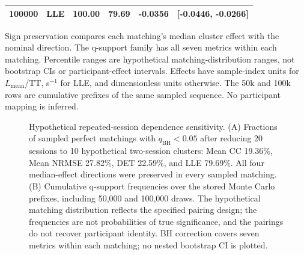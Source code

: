 \begin{table}[p]
{\begin{tabular}{lccccc}
100000 & LLE & 100.00 & 79.69 & -0.0356 & [-0.0446, -0.0266] \\
\bottomrule
\end{tabular}
}
\par\medskip
\begin{minipage}{\textwidth}\footnotesize
Sign preservation compares each matching's median cluster effect with the nominal direction. The q-support family has all seven metrics within each matching. Percentile ranges are hypothetical matching-distribution ranges, not bootstrap CIs or participant-effect intervals. Effects have sample-index units for $L_{\mathrm{mean}}$/TT, s$^{-1}$ for LLE, and dimensionless units otherwise. The 50k and 100k rows are cumulative prefixes of the same sampled sequence. No participant mapping is inferred.
\end{minipage}
\end{table}
\begin{figure}[p]
\centering
{}
\caption{Hypothetical repeated-session dependence sensitivity. (A) Fractions of sampled perfect matchings with $q_{\mathrm{BH}}<0.05$ after reducing 20 sessions to 10 hypothetical two-session clusters: Mean CC 19.36\%, Mean NRMSE 27.82\%, DET 22.59\%, and LLE 79.69\%. All four median-effect directions were preserved in every sampled matching. (B) Cumulative q-support frequencies over the stored Monte Carlo prefixes, including 50,000 and 100,000 draws. The hypothetical matching distribution reflects the specified pairing design; the frequencies are not probabilities of true significance, and the pairings do not recover participant identity. BH correction covers seven metrics within each matching; no nested bootstrap CI is plotted.}
\label{fig:supp_repeated}
\end{figure}

